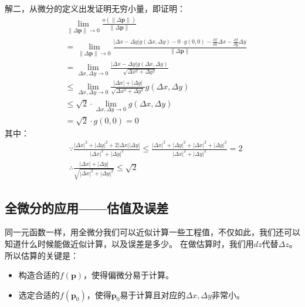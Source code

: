 解二，从微分的定义出发证明无穷小量，即证明：
\begin{align*}
&\underset{\left\| \Delta \boldsymbol{p} \right\| \rightarrow 0}{\lim}\frac{o\left( \left\| \Delta \boldsymbol{p} \right\| \right)}{\left\| \Delta \boldsymbol{p} \right\|} \\
&=\underset{\left\| \Delta \boldsymbol{p} \right\| \rightarrow 0}{\lim}\frac{\left| \Delta x-\Delta y \right|g\left( \Delta x,\Delta y \right) -0\cdot g\left( 0,0 \right) -\frac{\partial f}{\partial x}\Delta x-\frac{\partial f}{\partial y}\Delta y}{\left\| \Delta \boldsymbol{p} \right\|}
\\
&=\underset{\Delta x,\Delta y\rightarrow 0}{\lim}\frac{\left| \Delta x-\Delta y \right|g\left( \Delta x,\Delta y \right)}{\sqrt{\Delta x^2+\Delta y^2}} \\
&\leqslant \underset{\Delta x,\Delta y\rightarrow 0}{\lim}\frac{\left| \Delta x \right|+\left| \Delta y \right|}{\sqrt{\Delta x^2+\Delta y^2}}g\left( \Delta x,\Delta y \right) \\
&\leqslant \sqrt{2}\cdot \underset{\Delta x,\Delta y\rightarrow 0}{\lim}g\left( \Delta x,\Delta y \right) \\
&=\sqrt{2}\cdot g\left( 0,0 \right) =0
\end{align*}
其中：
\begin{align*}
&\because \frac{\left| \Delta x \right|^2+\left| \Delta y \right|^2+2\left| \Delta x \right|\left| \Delta y \right|}{\left| \Delta x \right|^2+\left| \Delta y \right|^2}\leqslant \frac{\left| \Delta x \right|^2+\left| \Delta y \right|^2+\left| \Delta x \right|^2+\left| \Delta y \right|^2}{\left| \Delta x \right|^2+\left| \Delta y \right|^2}=2 \\
&\therefore \frac{\left| \Delta x \right|+\left| \Delta y \right|}{\sqrt{\left| \Delta x \right|^2+\left| \Delta y \right|^2}}\leqslant \sqrt{2}
\end{align*}

\subsection{全微分的应用——估值及误差}

同一元函数一样，用全微分我们可以近似计算一些工程值，不仅如此，我们还可以知道什么时候能做近似计算，以及误差是多少。
在做估算时，我们用$dz$代替$\Delta z$。
所以估算的关键是：
\begin{itemize}
    \item 构造合适的$f\left( \boldsymbol{p} \right) $，使得偏微分易于计算。
    \item 选定合适的$f\left( \boldsymbol{p}_0 \right) $，使得$\boldsymbol{p}_0$易于计算且对应的$\Delta x,\Delta y$非常小。
\end{itemize}

